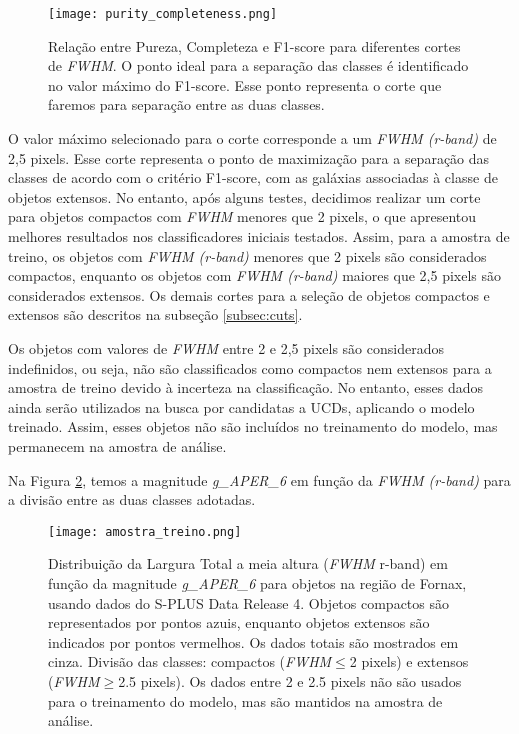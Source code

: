 \begin{figure}[!ht]
    \centering
    \texttt{[image: purity\_completeness.png]}
    \caption[]{Relação entre Pureza, Completeza e F1-score para diferentes cortes de \textit{FWHM}. O ponto ideal para a separação das classes é identificado no valor máximo do F1-score. Esse ponto representa o corte que faremos para separação entre as duas classes.}
    \label{purity_completeness}
\end{figure}

O valor máximo selecionado para o corte corresponde a um \textit{FWHM (r-band)} de 2,5 pixels. Esse corte representa o ponto de maximização para a separação das classes de acordo com o critério F1-score, com as galáxias associadas à classe de objetos extensos. No entanto, após alguns testes, decidimos realizar um corte para objetos compactos com \textit{FWHM} menores que 2 pixels, o que apresentou melhores resultados nos classificadores iniciais testados. Assim, para a amostra de treino, os objetos com \textit{FWHM (r-band)} menores que 2 pixels são considerados compactos, enquanto os objetos com \textit{FWHM (r-band)} maiores que 2,5 pixels são considerados extensos. Os demais cortes para a seleção de objetos compactos e extensos são descritos na subseção \ref{subsec:cuts}.

Os objetos com valores de \textit{FWHM} entre 2 e 2,5 pixels são considerados indefinidos, ou seja, não são classificados como compactos nem extensos para a amostra de treino devido à incerteza na classificação. No entanto, esses dados ainda serão utilizados na busca por candidatas a UCDs, aplicando o modelo treinado. Assim, esses objetos não são incluídos no treinamento do modelo, mas permanecem na amostra de análise.

Na Figura \ref{amostra_treino}, temos a magnitude \textit{g\_APER\_6} em função da \textit{FWHM (r-band)} para a divisão entre as duas classes adotadas.

\begin{figure}[!ht]
    \centering
    \texttt{[image: amostra\_treino.png]}
    \caption[]{Distribuição da Largura Total a meia altura (\textit{FWHM} r-band) em função da magnitude \textit{g\_APER\_6} para objetos na região de Fornax, usando dados do S-PLUS Data Release 4. Objetos compactos são representados por pontos azuis, enquanto objetos extensos são indicados por pontos vermelhos. Os dados totais são mostrados em cinza. Divisão das classes: compactos (\textit{FWHM}$\leq$2 pixels) e extensos (\textit{FWHM}$\geq$2.5 pixels). Os dados entre 2 e 2.5 pixels não são usados para o treinamento do modelo, mas são mantidos na amostra de análise.}
    \label{amostra_treino}
\end{figure}

